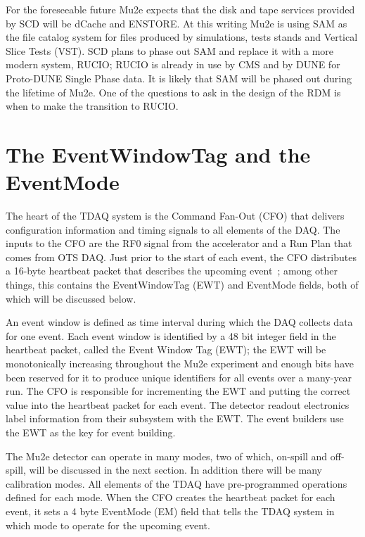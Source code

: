 For the foreseeable future Mu2e expects that the disk and tape services provided
by SCD will be dCache and ENSTORE.
At this writing Mu2e is using SAM as the file catalog system for files produced
by simulations, tests stands and Vertical Slice Tests (VST).
SCD plans to phase out SAM and replace it with a more modern system, RUCIO\cite{RUCIOHome};
RUCIO is already in use by CMS and by DUNE for Proto-DUNE Single Phase data.
It is likely that SAM will be phased out during the lifetime of Mu2e.
One of the questions to ask in the design of the RDM is
when to make the transition to RUCIO.

\section{The EventWindowTag and the EventMode}
\label{sec:EWTagAndEventMode}

The heart of the TDAQ system is the Command Fan-Out (CFO) that delivers
configuration information and timing signals to all elements of the DAQ.
The inputs to the CFO are the RF0 signal from the accelerator
and a Run Plan that comes from OTS DAQ.
Just prior to the start of each event,
the CFO distributes a 16-byte heartbeat packet that describes the upcoming event~\cite{PacketProtocols};
among other things, this contains the EventWindowTag (EWT) and EventMode fields,
both of which will be discussed below.

An event window is defined as time interval during which the DAQ collects data for one event.
Each event window is identified by a 48 bit integer field in the heartbeat packet, called
the Event Window Tag (EWT);
the EWT will be monotonically increasing throughout the Mu2e experiment and
enough bits have been reserved for it to produce unique identifiers for all
events over a many-year run.
The CFO is responsible for incrementing the EWT and putting the correct value into
the heartbeat packet for each event.
The detector readout electronics label information from their subsystem with the EWT.
The event builders use the EWT as the key for event building.

The Mu2e detector can operate in many modes, two of which,
on-spill and off-spill, will be discussed in the next section.
In addition there will be many calibration modes.
All elements of the TDAQ have pre-programmed operations defined for each mode.
When the CFO creates the heartbeat packet for each event,
it sets a 4 byte EventMode (EM) field
that tells the TDAQ system in which mode to operate for the upcoming event.

